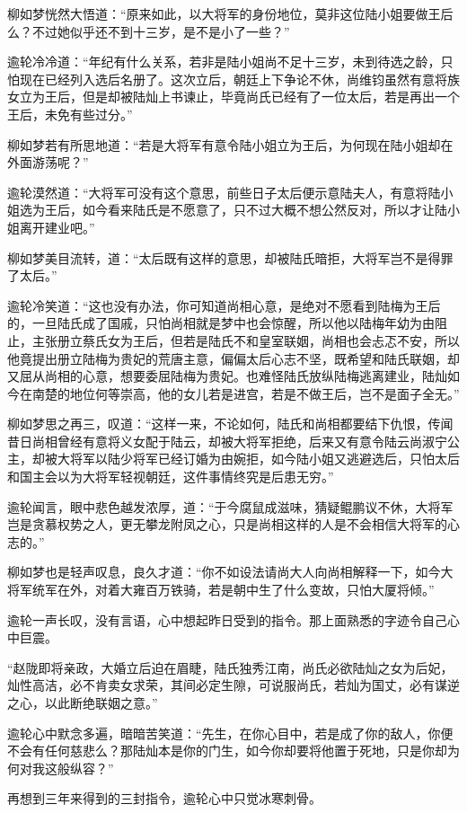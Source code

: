 柳如梦恍然大悟道：“原来如此，以大将军的身份地位，莫非这位陆小姐要做王后么？不过她似乎还不到十三岁，是不是小了一些？”

逾轮冷冷道：“年纪有什么关系，若非是陆小姐尚不足十三岁，未到待选之龄，只怕现在已经列入选后名册了。这次立后，朝廷上下争论不休，尚维钧虽然有意将族女立为王后，但是却被陆灿上书谏止，毕竟尚氏已经有了一位太后，若是再出一个王后，未免有些过分。”

柳如梦若有所思地道：“若是大将军有意令陆小姐立为王后，为何现在陆小姐却在外面游荡呢？”

逾轮漠然道：“大将军可没有这个意思，前些日子太后便示意陆夫人，有意将陆小姐选为王后，如今看来陆氏是不愿意了，只不过大概不想公然反对，所以才让陆小姐离开建业吧。”

柳如梦美目流转，道：“太后既有这样的意思，却被陆氏暗拒，大将军岂不是得罪了太后。”

逾轮冷笑道：“这也没有办法，你可知道尚相心意，是绝对不愿看到陆梅为王后的，一旦陆氏成了国戚，只怕尚相就是梦中也会惊醒，所以他以陆梅年幼为由阻止，主张册立蔡氏女为王后，但若是陆氏不和皇室联姻，尚相也会忐忑不安，所以他竟提出册立陆梅为贵妃的荒唐主意，偏偏太后心志不坚，既希望和陆氏联姻，却又屈从尚相的心意，想要委屈陆梅为贵妃。也难怪陆氏放纵陆梅逃离建业，陆灿如今在南楚的地位何等崇高，他的女儿若是进宫，若是不做王后，岂不是面子全无。”

柳如梦思之再三，叹道：“这样一来，不论如何，陆氏和尚相都要结下仇恨，传闻昔日尚相曾经有意将义女配于陆云，却被大将军拒绝，后来又有意令陆云尚淑宁公主，却被大将军以陆少将军已经订婚为由婉拒，如今陆小姐又逃避选后，只怕太后和国主会以为大将军轻视朝廷，这件事情终究是后患无穷。”

逾轮闻言，眼中悲色越发浓厚，道：“于今腐鼠成滋味，猜疑鲲鹏议不休，大将军岂是贪慕权势之人，更无攀龙附凤之心，只是尚相这样的人是不会相信大将军的心志的。”

柳如梦也是轻声叹息，良久才道：“你不如设法请尚大人向尚相解释一下，如今大将军统军在外，对着大雍百万铁骑，若是朝中生了什么变故，只怕大厦将倾。”

逾轮一声长叹，没有言语，心中想起昨日受到的指令。那上面熟悉的字迹令自己心中巨震。

“赵陇即将亲政，大婚立后迫在眉睫，陆氏独秀江南，尚氏必欲陆灿之女为后妃，灿性高洁，必不肯卖女求荣，其间必定生隙，可说服尚氏，若灿为国丈，必有谋逆之心，以此断绝联姻之意。”

逾轮心中默念多遍，暗暗苦笑道：“先生，在你心目中，若是成了你的敌人，你便不会有任何慈悲么？那陆灿本是你的门生，如今你却要将他置于死地，只是你却为何对我这般纵容？”

再想到三年来得到的三封指令，逾轮心中只觉冰寒刺骨。

